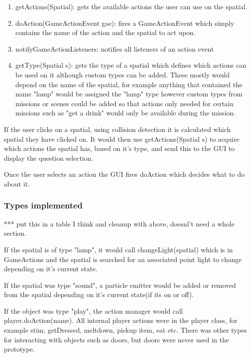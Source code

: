 \documentclass[11pt]{report}
\begin{document}
\begin{enumerate}
\item getActions(Spatial): gets the available actions the user can use on the spatial.
\item doAction(GameActionEvent gae): fires a GameActionEvent which simply contains the name of the action and the spatial to act upon.
\item notifyGameActionListeners: notifies all listeners of an action event
\item getType(Spatial s): gets the type of a spatial which defines which actions can be used on it although custom types can be added. These mostly would depend on the name of the spatial, for example anything that contained the name "lamp" would be assigned the "lamp" type however custom types from missions or scenes could be added so that actions only needed for certain missions such as "get a drink" would only be available during the mission.
\end{enumerate}

If the user clicks on a spatial, using collision detection it is calculated which spatial they have clicked on. It would then use getActions(Spatial s) to acquire which actions the spatial has, based on it's type, and send this to the GUI to display the question selection.

Once the user selects an action the GUI fires doAction which decides what to do about it.

\subsubsection*{Types implemented}
*** put this in a table I think and  cleanup with above, doesnl't need a whole section.

If the spatial is of type "lamp", it would call changeLight(spatial) which is in GameActions and the spatial is searched for an associated point light to change depending on it's current state. 

If the spatial was type "sound", a particle emitter would be added or removed from the spatial depending on it’s current state(if its on or off).

If the object was type "play", the action manager would call player.doAction(name). All internal player actions were in the player class, for example stim, getDressed, meltdown, pickup item, eat etc. There was other types for interacting with objects such as doors, but doors were never used in the prototype.
\end{document}

